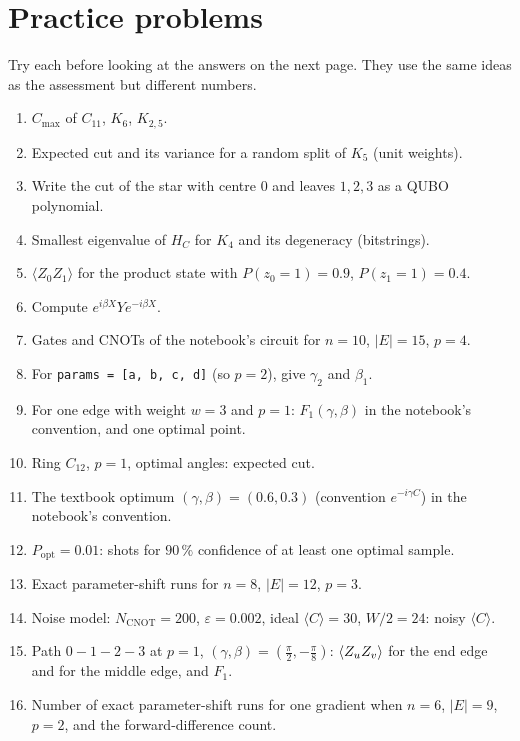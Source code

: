 \documentclass[11pt,a4paper,openany]{book}
\begin{document}
\section{Practice problems}
Try each before looking at the answers on the next page. They use the same ideas as the assessment but different numbers.
\begin{enumerate}[label=\textbf{P\arabic*.}, leftmargin=2.6em, itemsep=3pt]
\item $C_{\max}$ of $C_{11}$, $K_6$, $K_{2,5}$.
\item Expected cut and its variance for a random split of $K_5$ (unit weights).
\item Write the cut of the star with centre 0 and leaves $1, 2, 3$ as a QUBO polynomial.
\item Smallest eigenvalue of $H_C$ for $K_4$ and its degeneracy (bitstrings).
\item $\langle Z_0Z_1\rangle$ for the product state with $P(z_0 = 1) = 0.9$, $P(z_1 = 1) = 0.4$.
\item Compute $e^{i\beta X}Ye^{-i\beta X}$.
\item Gates and CNOTs of the notebook's circuit for $n = 10$, $|E| = 15$, $p = 4$.
\item For \texttt{params = [a, b, c, d]} (so $p = 2$), give $\gamma_2$ and $\beta_1$.
\item For one edge with weight $w = 3$ and $p = 1$: $F_1(\gamma, \beta)$ in the notebook's convention, and one optimal point.
\item Ring $C_{12}$, $p = 1$, optimal angles: expected cut.
\item The textbook optimum $(\gamma, \beta) = (0.6, 0.3)$ (convention $e^{-i\gamma C}$) in the notebook's convention.
\item $P_{\text{opt}} = 0.01$: shots for $90\,\%$ confidence of at least one optimal sample.
\item Exact parameter-shift runs for $n = 8$, $|E| = 12$, $p = 3$.
\item Noise model: $N_{\text{CNOT}} = 200$, $\varepsilon = 0.002$, ideal $\langle C\rangle = 30$, $W/2 = 24$: noisy $\langle C\rangle$.
\item Path $0{-}1{-}2{-}3$ at $p = 1$, $(\gamma, \beta) = (\frac\pi2, -\frac\pi8)$: $\braket{Z_uZ_v}$ for the end edge and for the middle edge, and $F_1$.
\item Number of exact parameter-shift runs for one gradient when $n = 6$, $|E| = 9$, $p = 2$, and the forward-difference count.
\end{enumerate}
\end{document}
